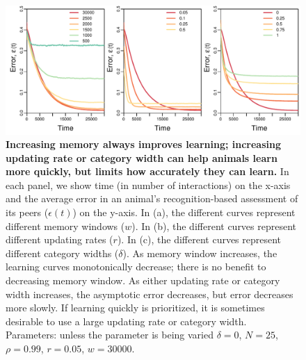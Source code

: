 \begin{figure}
\includegraphics[width=6.85in]{figures/speed_accuracy_tradeoff.pdf}
\caption{\sffamily\small\textbf{Increasing memory always improves learning; increasing updating rate or category width can help animals learn more quickly, but limits how accurately they can learn.} In each panel, we show time (in number of interactions) on the x-axis and the average error in an animal's recognition-based assessment of its peers ($\epsilon(t)$) on the y-axis. In (a), the different curves represent different memory windows ($w$). In (b), the different curves represent different updating rates ($r$). In (c), the different curves represent different category widths ($\delta$). As memory window increases, the learning curves monotonically decrease; there is no benefit to decreasing memory window. As either updating rate or category width increases, the asymptotic error decreases, but error decreases more slowly. If learning quickly is prioritized, it is sometimes desirable to use a large updating rate or category width. Parameters: unless the parameter is being varied $\delta=0$, $N=25$, $\rho=0.99$, $r=0.05$, $w=30000$.}
\label{tradeoff}
\end{figure}


